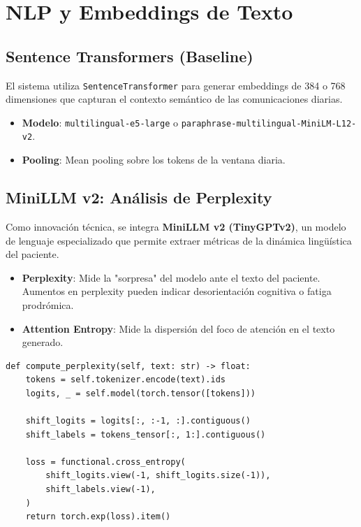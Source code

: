 \documentclass[11pt,a4paper]{article}
\begin{document}
\section{NLP y Embeddings de Texto}

\subsection{Sentence Transformers (Baseline)}

El sistema utiliza \texttt{SentenceTransformer} para generar embeddings de 384 o 768 dimensiones que capturan el contexto semántico de las comunicaciones diarias.

\begin{itemize}
    \item \textbf{Modelo}: \texttt{multilingual-e5-large} o \texttt{paraphrase-multilingual-MiniLM-L12-v2}.
    \item \textbf{Pooling}: Mean pooling sobre los tokens de la ventana diaria.
\end{itemize}

\subsection{MiniLLM v2: Análisis de Perplexity}

Como innovación técnica, se integra \textbf{MiniLLM v2 (TinyGPTv2)}, un modelo de lenguaje especializado que permite extraer métricas de la dinámica lingüística del paciente.

\begin{itemize}
    \item \textbf{Perplexity}: Mide la "sorpresa" del modelo ante el texto del paciente. Aumentos en perplexity pueden indicar desorientación cognitiva o fatiga prodrómica.
    \item \textbf{Attention Entropy}: Mide la dispersión del foco de atención en el texto generado.
\end{itemize}

\begin{lstlisting}[caption={Extracción de Perplexity con MiniLLM}]
def compute_perplexity(self, text: str) -> float:
    tokens = self.tokenizer.encode(text).ids
    logits, _ = self.model(torch.tensor([tokens]))
    
    shift_logits = logits[:, :-1, :].contiguous()
    shift_labels = tokens_tensor[:, 1:].contiguous()
    
    loss = functional.cross_entropy(
        shift_logits.view(-1, shift_logits.size(-1)),
        shift_labels.view(-1),
    )
    return torch.exp(loss).item()
\end{lstlisting}
\end{document}
